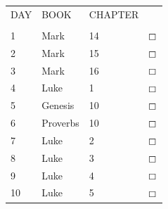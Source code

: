 \documentclass[11pt,landscape,twocolumn,letterpaper]{article}
\begin{document}
\begin{tabular}{p{0.5in}p{1.6in}p{1.3in}p{0.35in}}
  DAY & BOOK & CHAPTER &  \\ \\

  \textcolor[rgb]{0.00,0.00,1.00}{1} & \textcolor[rgb]{0.00,0.00,1.00}{Mark} & 14 & \textcolor[rgb]{0.00,0.00,1.00}{$\boxempty$}\\

  \textcolor[rgb]{0.00,0.00,1.00}{2} & \textcolor[rgb]{0.00,0.00,1.00}{Mark} & 15 & \textcolor[rgb]{0.00,0.00,1.00}{$\boxempty$}\\

  \textcolor[rgb]{0.00,0.00,1.00}{3} & \textcolor[rgb]{0.00,0.00,1.00}{Mark} & 16 & \textcolor[rgb]{0.00,0.00,1.00}{$\boxempty$}\\

   \textcolor[rgb]{0.00,0.00,1.00}{4} & \textcolor[rgb]{0.00,0.00,1.00}{Luke} & 1 & \textcolor[rgb]{0.00,0.00,1.00}{$\boxempty$}\\
   
  \textcolor[rgb]{0.00,0.00,1.00}{5} & \textcolor[rgb]{0.00,0.00,1.00}{\textcolor[rgb]{0.98,0.00,0.00}{Genesis}} & \textcolor[rgb]{0.98,0.00,0.00}{10} & \textcolor[rgb]{0.00,0.00,1.00}{$\boxempty$}\\

  \textcolor[rgb]{0.00,0.00,1.00}{6} & \textcolor[rgb]{0.00,0.00,1.00}{\textcolor[rgb]{0.98,0.00,0.00}{Proverbs}} & \textcolor[rgb]{0.98,0.00,0.00}{10} & \textcolor[rgb]{0.00,0.00,1.00}{$\boxempty$}\\

  \textcolor[rgb]{0.00,0.00,1.00}{7} & \textcolor[rgb]{0.00,0.00,1.00}{Luke} & 2 & \textcolor[rgb]{0.00,0.00,1.00}{$\boxempty$}\\

  \textcolor[rgb]{0.00,0.00,1.00}{8} & \textcolor[rgb]{0.00,0.00,1.00}{Luke} & 3 & \textcolor[rgb]{0.00,0.00,1.00}{$\boxempty$}\\

  \textcolor[rgb]{0.00,0.00,1.00}{9} & \textcolor[rgb]{0.00,0.00,1.00}{Luke} & 4 & \textcolor[rgb]{0.00,0.00,1.00}{$\boxempty$}\\

   \textcolor[rgb]{0.00,0.00,1.00}{10} & \textcolor[rgb]{0.00,0.00,1.00}{Luke} & 5 & \textcolor[rgb]{0.00,0.00,1.00}{$\boxempty$}\\


\end{tabular}
\end{document}
